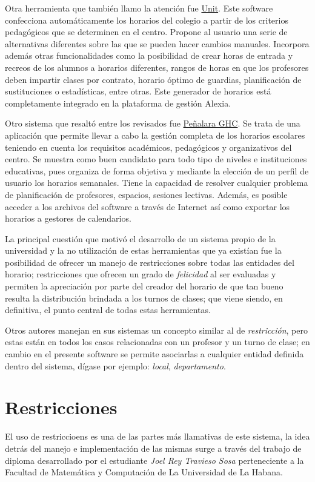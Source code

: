 Otra herramienta que también llamo la atención fue \href{http://www.educaria.es/#horarios2}{Unit}\cite{Unit}. Este software confecciona automáticamente los horarios del colegio a partir de los criterios pedagógicos que se determinen en el centro. Propone al usuario una serie de alternativas diferentes sobre las que se pueden hacer cambios manuales. Incorpora además otras funcionalidades como la posibilidad de crear horas de entrada y recreos de los alumnos a horarios diferentes, rangos de horas en que los profesores deben impartir clases por contrato, horario óptimo de guardias, planificación de sustituciones o estadísticas, entre otras. Este generador de horarios está completamente integrado en la plataforma de gestión Alexia.\cite{Alexia}

Otro sistema que resaltó entre los revisados fue \href{https://www.penalara.com/es/CU}{Peñalara GHC}\cite{Penalara_GHC}. Se trata de una aplicación que permite llevar a cabo la gestión completa de los horarios escolares teniendo en cuenta los requisitos académicos, pedagógicos y organizativos del centro. Se muestra como buen candidato para todo tipo de niveles e instituciones educativas, pues organiza de forma objetiva y mediante la elección de un perfil de usuario los horarios semanales. Tiene la capacidad de resolver cualquier problema de planificación de profesores, espacios, sesiones lectivas. Además, es posible acceder a los archivos del software a través de Internet así como exportar los horarios a gestores de calendarios.

La principal cuestión que motivó el desarrollo de un sistema propio de la universidad y la no utilización de estas herramientas que ya existían fue la posibilidad de ofrecer un manejo de restricciones sobre todas las entidades del horario; restricciones que ofrecen un grado de \emph{felicidad} al ser evaluadas y permiten la apreciación por parte del creador del horario de que tan bueno resulta la distribución brindada a los turnos de clases; que viene siendo, en definitiva, el punto central de todas estas herramientas. 

Otros autores manejan en sus sistemas un concepto similar al de \emph{restricción}, pero estas están en todos los casos relacionadas con un profesor y un turno de clase; en cambio en el presente software se permite asociarlas a cualquier entidad definida dentro del sistema, dígase por ejemplo: \emph{local}, \emph{departamento}.

\section{Restricciones}
\label{state_of_art:restrictions}
El uso de restriccioens es una de las partes más llamativas de este sistema, la idea detrás del manejo e implementación de las mismas surge a través del trabajo de diploma desarrollado por el estudiante \textit{Joel Rey Travieso Sosa} \cite{thesis_joel} perteneciente a la Facultad de Matemática y Computación de La Universidad de La Habana.

